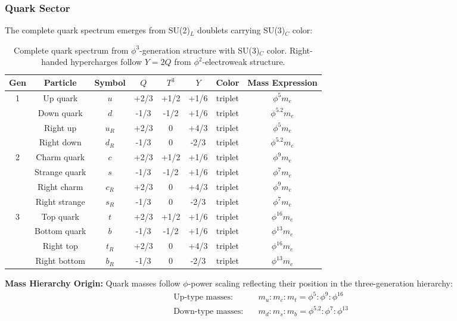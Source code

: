 \subsubsection{Quark Sector}

The complete quark spectrum emerges from SU(2)$_L$ doublets carrying SU(3)$_C$ color:

\begin{table}[H]
\centering
\begin{tabular}{|c|c|c|c|c|c|c|c|}
\hline
\textbf{Gen} & \textbf{Particle} & \textbf{Symbol} & \textbf{$Q$} & \textbf{$T^3$} & \textbf{$Y$} & \textbf{Color} & \textbf{Mass Expression} \\
\hline
\multirow{4}{*}{1} & Up quark & $u$ & +2/3 & +1/2 & +1/6 & triplet & $\phi^5 m_e$ \\
& Down quark & $d$ & -1/3 & -1/2 & +1/6 & triplet & $\phi^{5.2} m_e$ \\
& Right up & $u_R$ & +2/3 & 0 & +4/3 & triplet & $\phi^5 m_e$ \\
& Right down & $d_R$ & -1/3 & 0 & -2/3 & triplet & $\phi^{5.2} m_e$ \\
\hline
\multirow{4}{*}{2} & Charm quark & $c$ & +2/3 & +1/2 & +1/6 & triplet & $\phi^9 m_e$ \\
& Strange quark & $s$ & -1/3 & -1/2 & +1/6 & triplet & $\phi^7 m_e$ \\
& Right charm & $c_R$ & +2/3 & 0 & +4/3 & triplet & $\phi^9 m_e$ \\
& Right strange & $s_R$ & -1/3 & 0 & -2/3 & triplet & $\phi^7 m_e$ \\
\hline
\multirow{4}{*}{3} & Top quark & $t$ & +2/3 & +1/2 & +1/6 & triplet & $\phi^{16} m_e$ \\
& Bottom quark & $b$ & -1/3 & -1/2 & +1/6 & triplet & $\phi^{13} m_e$ \\
& Right top & $t_R$ & +2/3 & 0 & +4/3 & triplet & $\phi^{16} m_e$ \\
& Right bottom & $b_R$ & -1/3 & 0 & -2/3 & triplet & $\phi^{13} m_e$ \\
\hline
\end{tabular}
\caption{Complete quark spectrum from $\phi^3$-generation structure with SU(3)$_C$ color. Right-handed hypercharges follow $Y = 2Q$ from $\phi^2$-electroweak structure.}
\end{table}

\textbf{Mass Hierarchy Origin:}
Quark masses follow $\phi$-power scaling reflecting their position in the three-generation hierarchy:
\begin{align}
\text{Up-type masses:} &\quad m_u : m_c : m_t = \phi^5 : \phi^9 : \phi^{16}\\
\text{Down-type masses:} &\quad m_d : m_s : m_b = \phi^{5.2} : \phi^7 : \phi^{13}
\end{align}


